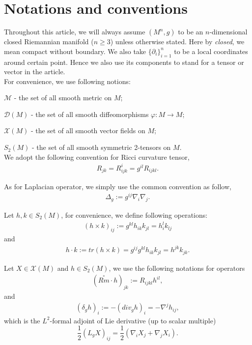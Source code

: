 \documentclass[12pt]{amsart}
\theoremstyle{definition}
\theoremstyle{remark}
\numberwithin{equation}{section}
\begin{document}
\section{Notations and conventions}

Throughout this article, we will always assume $(M^n, g)$ to be an $n$-dimensional closed Riemannian manifold ($n \geq 3$) unless otherwise stated. Here by \emph{closed}, we mean compact without boundary. We also take $\{\partial_i\}_{i=1}^n$ to be a local coordinates around certain point. Hence we also use its components to stand for a tensor or vector in the article.\\

For convenience, we use following notions:

$\mathcal{M}$ - the set of all smooth metric on $M$;

$\mathscr{D}(M)$ - the set of all smooth diffeomorphisms $ \varphi : M \rightarrow M$;

$\mathscr{X}(M)$ - the set of all smooth vector fields on $M$;

$S_2(M)$ - the set of all smooth symmetric 2-tensors on $M$.\\

We adopt the following convention for Ricci curvature tensor,
\begin{align*}
R_{jk} = R^i_{ijk} = g^{il} R_{ijkl}.
\end{align*}

As for Laplacian operator, we simply use the common convention as follow,
\begin{align*}
\Delta_g := g^{ij} \nabla_i \nabla_j.
\end{align*}

Let $h, k \in S_2(M)$, for convenience, we define following operations:
\begin{align*}
(h \times k )_{ij} := g^{kl}h_{ik}k_{jl} = h_i^lk_{lj}
\end{align*}
and
\begin{align*}
h \cdot k  := tr (h \times k) = g^{ij}g^{kl}h_{ik}k_{jl} = h^{jk}k_{jk}.
\end{align*}

Let $X \in \mathscr{X}(M)$ and $h \in S_2(M)$, we use the following notations for operators
\begin{align*}
(\overset{\circ}{Rm} \cdot h )_{jk}:= R_{ijkl} h^{il},
\end{align*}
and
\begin{align*}
(\delta_g h)_i := - (div_g h)_i = -\nabla^j h_{ij},
\end{align*}
which is the $L^2$-formal adjoint of Lie derivative (up to scalar multiple) $$\frac{1}{2}(L_g X)_{ij} = \frac{1}{2} ( \nabla_i X_j + \nabla_j X_i).$$\\
\end{document}
